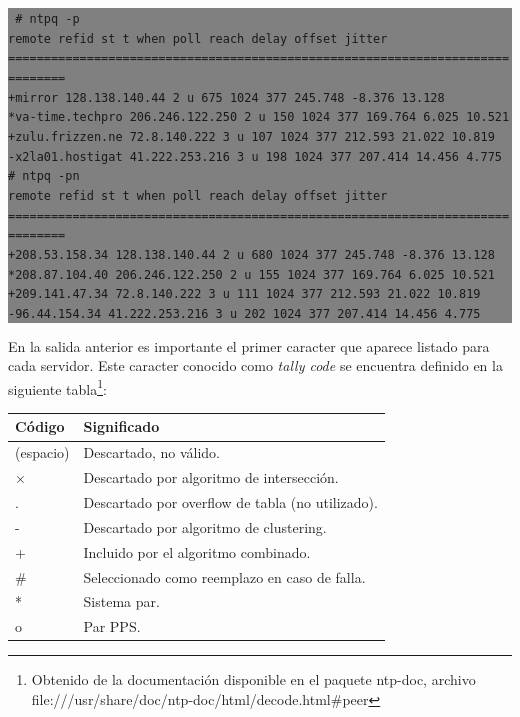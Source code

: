 \documentclass[12pt]{article}
\begin{document}
\colorbox{grey}{\parbox[t]{0.95\linewidth}{ \vspace*{0.5cm} {\tt      
\# ntpq -p\\
     remote           refid      st t when poll reach   delay   offset  jitter\\
==============================================================================\\
+mirror          128.138.140.44   2 u  675 1024  377  245.748   -8.376  13.128\\
*va-time.techpro 206.246.122.250  2 u  150 1024  377  169.764    6.025  10.521\\
+zulu.frizzen.ne 72.8.140.222     3 u  107 1024  377  212.593   21.022  10.819\\
-x2la01.hostigat 41.222.253.216   3 u  198 1024  377  207.414   14.456   4.775\\
\# ntpq -pn\\
     remote           refid      st t when poll reach   delay   offset  jitter\\
==============================================================================\\
+208.53.158.34   128.138.140.44   2 u  680 1024  377  245.748   -8.376  13.128\\
*208.87.104.40   206.246.122.250  2 u  155 1024  377  169.764    6.025  10.521\\
+209.141.47.34   72.8.140.222     3 u  111 1024  377  212.593   21.022  10.819\\
-96.44.154.34    41.222.253.216   3 u  202 1024  377  207.414   14.456   4.775\\

 } \vspace*{0.5cm} } } 

En la salida anterior es importante el primer caracter que aparece listado para
cada servidor. Este caracter conocido como \textit{tally code} se encuentra definido 
en la siguiente tabla\footnote{Obtenido de la documentación disponible en el paquete
ntp-doc, archivo file:///usr/share/doc/ntp-doc/html/decode.html\#peer}: 

\begin{center}
\begin{tabular}{|l|l|}\hline 
Código & Significado \\\hline
  (espacio) & Descartado, no válido.\\\hline
× & Descartado por algoritmo de intersección.\\\hline
. & Descartado por overflow de tabla (no utilizado).\\\hline
- & Descartado por algoritmo de clustering. \\\hline
+ & Incluido por el algoritmo combinado.\\\hline
\# & Seleccionado como reemplazo en caso de falla.\\\hline
* & Sistema par.\\\hline
o & Par PPS.\\\hline
\end{tabular}
\end{center}
\end{document}
